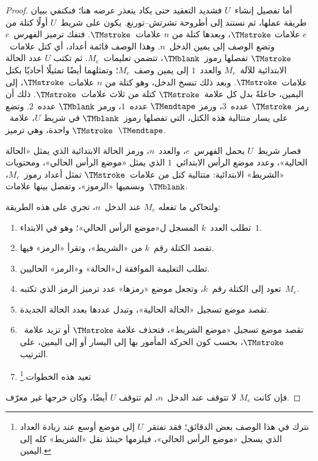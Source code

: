 \documentclass[../../../include/open-logic-section]{subfiles}
\begin{document}
\begin{proof}
  أما تفصيل إنشاء~$U$ فشديد التعقيد حتى يكاد يتعذر عرضه هنا؛
  فنكتفي ببيان طريقة عملها، ثم نستند إلى أطروحة تشرتش--تورنغ.
  يكون على شريط~$U$ أولًا كتلة من $e$ علامات $\TMstroke$،
  وبعدها كتلة من $n$ علامات~$\TMstroke$. فتفك ترميز الفهرس~$e$
  وتضع الوصف إلى يمين الدخل~$n$. وهذا الوصف قائمة أعداد، أي كتل
  علامات~$\TMstroke$ تفصلها رموز~$\TMblank$، تتضمن تعليمات~$M_e$.
  ثم تكتب $U$ عدد الحالة الابتدائية للآلة~$M_e$ والعدد~$1$
  إلى يمين وصف~$M_e$؛ وتمثلهما أيضًا تمثيلًا أحاديًا بكتل
  علامات~$\TMstroke$. وبعد ذلك تنسخ الدخل، وهو كتلة من $n$
  علامات~$\TMstroke$، إلى اليمين، جاعلةً بدل كل علامة~$\TMstroke$
  كتلة من ثلاث علامات~$\TMstroke$. ذلك أن رمز $\TMstroke$
  عدده~$3$، ورمز $\TMendtape$ عدده~$1$، ورمز $\TMblank$
  عدده~$2$. وتضع على يسار متتالية هذه الكتل، التي تفصلها
  رموز~$\TMblank$ في شريط $U$، علامة~$\TMstroke$ واحدة،
  وهي ترميز~$\TMendtape$.

  فصار شريط~$U$ يحمل الفهرس~$e$، والعدد~$n$، ورمز الحالة
  الابتدائية الذي يمثل «الحالة الحالية»، وعدد موضع الرأس الابتدائي~$1$
  الذي يمثل «موضع الرأس الحالي»، ومحتويات «الشريط» الابتدائية:
  متتالية كتل من علامات~$\TMstroke$ تمثل أعداد رموز~$M_e$،
  ونسميها «الرموز»، وتفصل بينها علامات~$\TMblank$.

  ولتحاكي ما تفعله $M_e$ عند الدخل~$n$، تجري على هذه الطريقة:
  \begin{enumerate}
    \item تطلب العدد~$k$ المسجل ل«موضع الرأس الحالي»؛ وهو في
    الابتداء~$1$.
    \item تقصد الكتلة رقم~$k$ من «الشريط»، وتقرأ «الرمز» فيها.
    \item{}%
    تطلب التعليمة الموافقة ل«الحالة» و«الرمز» الحاليين.
    \item تعود إلى الكتلة رقم~$k$، وتجعل موضع «رمزها» عدد ترميز
    الرمز الذي تكتبه~$M_e$.
    \item تقصد موضع تسجيل «الحالة الحالية»، وتبدل عددها بعدد
    الحالة الجديدة.
    \item تقصد موضع تسجيل «موضع الشريط»، فتحذف علامة
    $\TMstroke$ أو تزيد علامة~$\TMstroke$، بحسب كون الحركة
    المأمور بها إلى اليسار أو إلى اليمين، على الترتيب.
    \item تعيد هذه الخطوات.\footnote{نترك في هذا الوصف بعض
    الدقائق؛ فقد تفتقر~$U$ إلى موضع أوسع عند زيادة العداد الذي
    يسجل «موضع الرأس الحالي»، فيلزمها حينئذ نقل «الشريط» كله
    إلى اليمين.}
  \end{enumerate}
  فإن كانت $M_e$ لا تتوقف عند الدخل~$n$، لم تتوقف $U$ أيضًا،
  وكان خرجها غير معرّف.


\end{proof}
\end{document}
